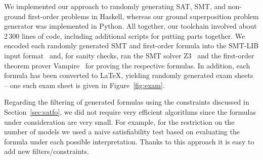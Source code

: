We implemented our approach to randomly generating
SAT, SMT, and non-ground first-order problems in Haskell, whereas
our ground superposition problem generator was implemented in
Python. All together, our toolchain involved about 2\,300 lines of code,
including additional scripts for putting parts together.
We encoded each randomly generated SMT and first-order formula into
the SMT-LIB input format~\cite{barrett2017smtlib} and, for sanity checks, ran the SMT
solver Z3~\cite{Z3}  and the first-order theorem prover
Vampire~\cite{Vampire13} for proving the respective formulas.
In addition, each formula has been converted  to \LaTeX{}, yielding
randomly generated exam sheets -- one such exam sheet is given in
Figure~\ref{fig:exam}.

Regarding the filtering of generated formulas using the constraints discussed in Section~\ref{sec:satfo},
we did not require very efficient algorithms since the formulas under consideration are very small.
For example, for the restriction on the number of models we used a naive satisfiability test
based on evaluating the formula under each possible interpretation.
Thanks to this approach it is easy to add new filters/constraints.


